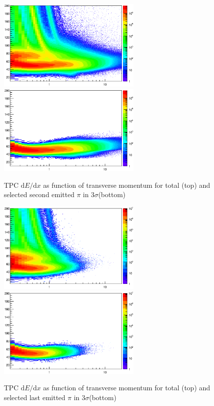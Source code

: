  
 \begin{figure}[htbp]
\begin{center}
\includegraphics[width=7.0cm]{./Version1/FigChapter5/Selection/PbPbTPC2ndPion.eps}
\hspace{0.5cm}
\includegraphics[width=7.0cm]{./Version1/FigChapter5/Selection/PbPbTPC2ndPionAfter.eps}
\label{fig:PbPb:TPCpionSecondEmitted} 
\caption{ TPC $\mathrm{d}E/\mathrm{d}x$ as function of transverse momentum for total (top) and selected second emitted $\pi$ in 3$\sigma$(bottom) }
\end{center}
\end{figure}


\begin{figure}[htbp]
\begin{center}
\includegraphics[width=7.0cm]{./Version1/FigChapter5/Selection/PbPbTPC1stPion.eps}
\hspace{0.5cm}
\includegraphics[width=7.0cm]{./Version1/FigChapter5/Selection/PbPbTPC1stPionAfter.eps}
\label{fig:PbPb:TPCpionLastEmitted} 
\caption{ TPC $\mathrm{d}E/\mathrm{d}x$ as function of transverse momentum for total (top) and selected last emitted $\pi$ in 3$\sigma$(bottom) }
\end{center}
\end{figure}


